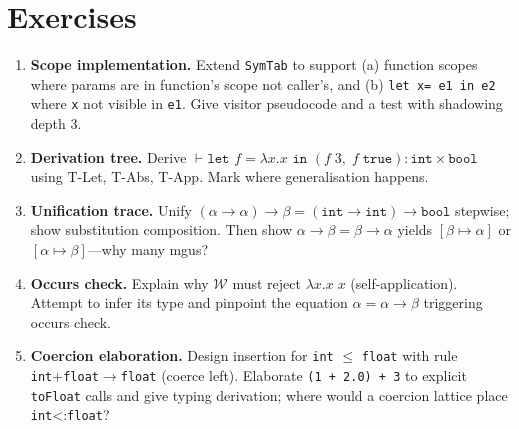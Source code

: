 \section{Exercises}
\label{sec:ch04-exercises}
\begin{enumerate}[label=E4.\arabic*, leftmargin=*, itemsep=0.8em]
\item \textbf{Scope implementation.} Extend \texttt{SymTab} to support (a) function scopes where params are in function's scope not caller's, and (b) \texttt{let x= e1 in e2} where \texttt{x} not visible in \texttt{e1}. Give visitor pseudocode and a test with shadowing depth 3.
\item \textbf{Derivation tree.} Derive $\vdash \texttt{let }f=\lambda x.x\texttt{ in }(f\;3,\;f\;\texttt{true}) : \texttt{int}\times\texttt{bool}$ using T-Let, T-Abs, T-App. Mark where generalisation happens.
\item \textbf{Unification trace.} Unify $(\alpha\to\alpha)\to\beta = (\texttt{int}\to\texttt{int})\to\texttt{bool}$ stepwise; show substitution composition. Then show $\alpha\to\beta = \beta\to\alpha$ yields $[\beta\mapsto\alpha]$ or $[\alpha\mapsto\beta]$---why many mgus?
\item \textbf{Occurs check.} Explain why $\mathcal{W}$ must reject $\lambda x.x\;x$ (self-application). Attempt to infer its type and pinpoint the equation $\alpha=\alpha\to\beta$ triggering occurs check.
\item \textbf{Coercion elaboration.} Design insertion for \texttt{int} $\le$ \texttt{float} with rule \texttt{int}+\texttt{float}$\to$\texttt{float} (coerce left). Elaborate \texttt{(1 + 2.0) + 3} to explicit \texttt{toFloat} calls and give typing derivation; where would a coercion lattice place \texttt{int}<:\texttt{float}?
\end{enumerate}
